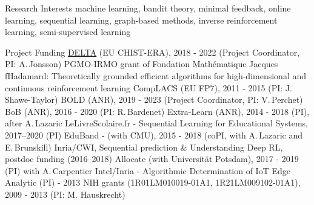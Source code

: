 \documentclass{resume}
\begin{document}

\begin{category}{Research Interests}
\citemnobullet machine learning, bandit theory, minimal feedback, 
online learning, sequential learning, graph-based methods, inverse 
reinforcement learning, semi-supervised learning
\end{category}


\begin{category}{Project Funding}
\citembullet \href{https://www.upf.edu/web/delta}{DELTA} (EU CHIST-ERA), 2018 - 2022  (Project Coordinator, PI: A.\,Jonsson)
\citembullet  PGMO-IRMO grant of Fondation Math\' ematique Jacques fHadamard: Theoretically grounded efficient algorithms for high-dimensional and continuous
reinforcement learning
\citembullet CompLACS (EU FP7), 2011 - 2015 (PI: J.\,Shawe-Taylor)
\citembullet BOLD (ANR), 2019 - 2023  (Project Coordinator, PI: V.\,Perchet)
\citembullet BoB (ANR), 2016 - 2020  (PI: R.\,Bardenet)
\citembullet Extra-Learn (ANR), 2014 - 2018  (PI), after A.\,Lazaric
\citembullet LeLivreScolaire.fr - Sequential Learning for Educational Systems, 2017--2020 (PI)
\citembullet EduBand - (with CMU), 2015 - 2018  (coPI, with A.\,Lazaric and E.\,Brunskill)  
\citembullet  Inria/CWI, Sequential prediction \& Understanding Deep RL, postdoc funding (2016--2018)
\citembullet Allocate (with Universit\"{a}t Potsdam), 2017 - 2019  (PI) with A.\,Carpentier  
\citembullet Intel/Inria - Algorithmic Determination of IoT Edge Analytic (PI) -
2013 
\citembullet NIH grants (1R01LM010019-01A1, 1R21LM009102-01A1), 2009 - 
2013 (PI: M. Hauskrecht)
\end{category}
\end{document}
